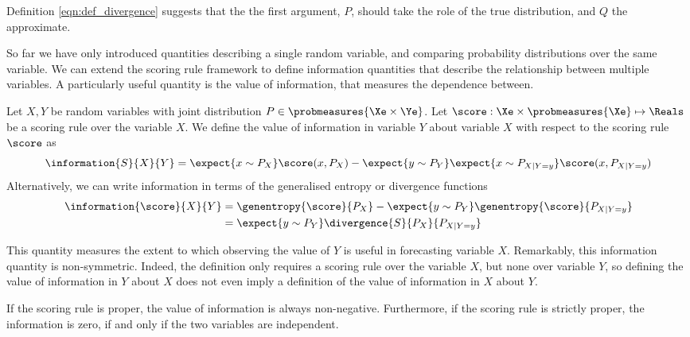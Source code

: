 Definition \eqref{eqn:def_divergence} suggests that the the first argument, $P$, should take the role of the true distribution, and $Q$ the approximate. 

So far we have only introduced quantities describing a single random variable, and comparing probability distributions over the same variable. We can extend the scoring rule framework to define information quantities that describe the relationship between multiple variables. A particularly useful quantity is the value of information, that measures the dependence between.

\begin{definition}
	Let $X,Y$ be random variables with joint distribution $P\in\probmeasures{\Xe\times\Ye}$. Let $\score:\Xe\times\probmeasures{\Xe}\mapsto\Reals$ be a scoring rule over the variable $X$. We define the value of information in variable $Y$ about variable $X$ with respect to the scoring rule $\score$ as
	\begin{equation}
		\information{S}{X}{Y} =  \expect{x\sim P_{X}}\score(x,P_{X})- \expect{y\sim P_{Y}} \expect{x\sim P_{X\vert Y=y}}\score(x,P_{X\vert Y=y})
	\end{equation}
	Alternatively, we can write information in terms of the generalised entropy or divergence functions
		\begin{align}
			\information{\score}{X}{Y} &=  \genentropy{\score}{P_{X}} - \expect{y \sim P_{Y}} \genentropy{\score}{P_{X\vert Y=y}}\\
				&= \expect{y\sim P_{Y}}\divergence{S}{P_{X}}{P_{X\vert Y=y}}
		\end{align}
\end{definition}

This quantity measures the extent to which observing the value of $Y$ is useful in forecasting variable $X$. Remarkably, this information quantity is non-symmetric. Indeed, the definition only requires a scoring rule over the variable $X$, but none over variable $Y$, so defining the value of information in $Y$ about $X$ does not even imply a definition of the value of information in $X$ about $Y$.

If the scoring rule is proper, the value of information is always non-negative. Furthermore, if the scoring rule is strictly proper, the information is zero, if and only if the two variables are independent.

